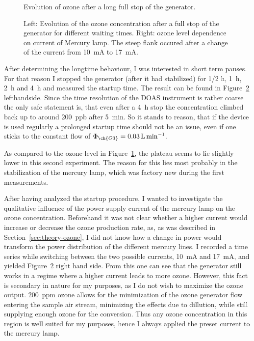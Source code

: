 \begin{figure}[htbp]
  \centering
  
  \caption{Evolution of ozone after a long full stop of the
    generator.}
  \label{fig:long-stop}
\end{figure}
\begin{figure}[htbp]
  \centering
  
  \hfill
  
  \caption{Left: Evolution of the ozone concentration after a full stop of the
    generator for different waiting times. Right: ozone level
    dependence on current of Mercury lamp. The steep
    flank occured after a change of the current from
    \SI{10}{\milli\ampere} to \SI{17}{\milli\ampere}.}
  \label{fig:multiple-stop}
\end{figure}

After determining the longtime behaviour, I was interested in
short term pauses. For that reason I stopped the generator (after it
had stabilized) for {\nfrac{} 1/2} \si{\hour}, \SI{1}{\hour},
\SI{2}{\hour} and \SI{4}{\hour} and measured the startup time. The
result can be found in Figure~\ref{fig:multiple-stop}
lefthandside. Since the time resolution of the DOAS instrument is
rather coarse the only safe statement is, that even after a
\SI{4}{\hour} stop the concentration climbed back up to around
\SI{200}{ppb} after \SI{5}{\minute}. So it stands to reason, that if
the device is used regularly a prolonged startup time should not be an
issue, even if one sticks to the constant flow of $\Phi_{\ch{O3}} =
\SI{0.03}{\liter\per\minute}$.

As compared to the ozone level in Figure~\ref{fig:long-stop}, the
plateau seems to lie slightly lower in this second experiment. The
reason for this lies most probably in the stabilization of the mercury
lamp, which was factory new during the first measurements.

After having analyzed the startup procedure, I wanted to investigate
the qualitative influence of the power supply current of the mercury
lamp on the ozone concentration. Beforehand it was not clear whether a
higher current would increase or decrease the ozone production rate,
as, as was described in Section~\ref{sec:theory-ozone}, I did not know
how a change in power would transform the power distribution of the
different mercury lines. I recorded a time series while switching
between the two possible currents, \SI{10}{\milli\ampere} and
\SI{17}{\milli\ampere}, and yielded Figure~\ref{fig:multiple-stop}
right hand side. From this one can see that the generator still works
in a regime where a higher current leads to more ozone. However, this
fact is secondary in nature for my purposes, as I do not wish to
maximize the ozone output. \SI{200}{ppm} ozone allows for the
minimization of the ozone generator flow entering the sample air
stream, minimizing the effects due to dillution, while still supplying
enough ozone for the conversion. Thus any ozone concentration in this
region is well suited for my purposes, hence I always applied the
preset current to the mercury lamp.

